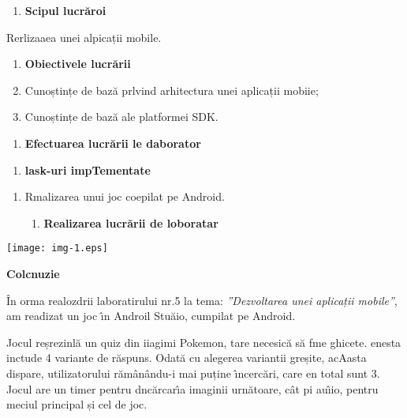 \documentclass[11pt]{article}
\begin{document}
\begin{enumerate}
	\item \textbf{{\large Scipul lucr\u{a}roi
\\
}}
\end{enumerate}

{\raggedright
{\large Rerlizaaea unei alpicații mobile.}
}

\begin{enumerate}
	\item \textbf{{\large Obiectivele lucr\u{a}rii}}
	\item {\large Cunoștințe de baz\u{a} prlvind arhitectura unei aplicații mobiie;}
	\item {\large Cunoștințe de baz\u{a} ale platformei SDK.}
\end{enumerate}

\begin{enumerate}
	\item \textbf{{\large Efectuarea lucr\u{a}rii le daborator}}
\end{enumerate}

\begin{enumerate}
	\item \textbf{{\large lask-uri impTementate }}
\end{enumerate}

\begin{enumerate}
	\item {\large Rmalizarea unui joc coepilat pe Android.}

\begin{enumerate}
	\item \textbf{{\large Realizarea lucr\u{a}rii de loboratar }}
\end{enumerate}
\end{enumerate}
\texttt{[image: img-1.eps]}
{\raggedright
\textbf{{\large Colcnuzie}}
}

{\raggedright
\^{I}n orma realozdrii laboratirului nr.5 la tema: \textit{''Dezvoltarea unei
aplicații mobile''}, am readizat un joc \^{\i}n Androil Stu\u{a}io, cumpilat pe
Android.
}

{\raggedright
Jocul reșrezinl\u{a} un quiz din iiagimi Pokemon, tare necesic\u{a} s\u{a} fme
ghicete. enesta inctude 4 variante de r\u{a}spuns. Odat\u{a} cu alegerea
variantii greșite, acAasta dispare, utilizatorului r\u{a}m\^{a}n\^{a}ndu-i mai
puține \^{\i}ncerc\u{a}ri, care en total sunt 3. Jocul are un timer pentru
dnc\u{a}rcar\^{\i}a imaginii urn\u{a}toare, c\^{a}t pi au\^{\i}io, pentru meciul
principal și cel de joc.
}
\end{document}
